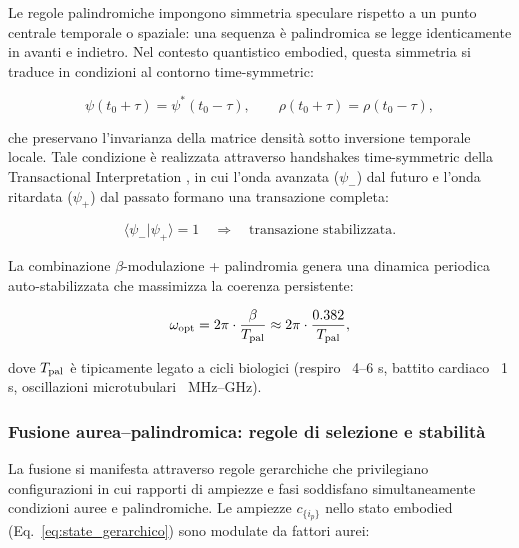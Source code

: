\documentclass[11pt,a4paper]{article}
\let\oldcite\cite
\renewcommand{\cite}{\protect\oldcite}
\let\oldref\ref
\renewcommand{\ref}{\protect\oldref}
\theoremstyle{plain}
\theoremstyle{definition}
\begin{document}
\vspace{0.3cm}

Le regole palindromiche impongono simmetria speculare rispetto a un punto centrale temporale o spaziale: una sequenza è palindromica se legge identicamente in avanti e indietro. Nel contesto quantistico embodied, questa simmetria si traduce in condizioni al contorno time-symmetric:

\begin{equation}
\psi(t_0 + \tau) = \psi^*(t_0 - \tau), \qquad \rho(t_0 + \tau) = \rho(t_0 - \tau),
\label{eq:palindromic_boundary}
\end{equation}

\vspace{0.3cm}

che preservano l'invarianza della matrice densità sotto inversione temporale locale. Tale condizione è realizzata attraverso handshakes time-symmetric della Transactional Interpretation \cite{cramer2017transactional}, in cui l'onda avanzata ($\psi_-$) dal futuro e l'onda ritardata ($\psi_+$) dal passato formano una transazione completa:

\begin{equation}
\langle \psi_- | \psi_+ \rangle = 1 \quad \Rightarrow \quad \text{transazione stabilizzata}.
\label{eq:transaction_condition}
\end{equation}

La combinazione $\beta$-modulazione + palindromia genera una dinamica periodica auto-stabilizzata che massimizza la coerenza persistente:

\begin{equation}
\omega_{\rm opt} = 2\pi \cdot \frac{\beta}{T_{\rm pal}} \approx 2\pi \cdot \frac{0.382}{T_{\rm pal}},
\label{eq:frequenza_ottima}
\end{equation}

dove $T_{\rm pal}$ è tipicamente legato a cicli biologici (respiro ~4–6 s, battito cardiaco ~1 s, oscillazioni microtubulari ~MHz–GHz).


\vspace{0.3cm}

\subsubsection{Fusione aurea–palindromica: regole di selezione e stabilità}

\vspace{0.3cm}

La fusione si manifesta attraverso regole gerarchiche che privilegiano configurazioni in cui rapporti di ampiezze e fasi soddisfano simultaneamente condizioni auree e palindromiche. Le ampiezze $c_{\{i_p\}}$ nello stato embodied (Eq.~\ref{eq:state_gerarchico}) sono modulate da fattori aurei:
\end{document}

